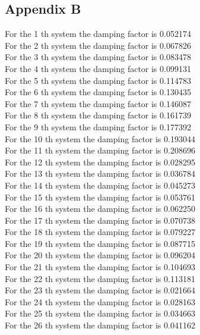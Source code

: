 \documentclass[11pt]{article}
\begin{document}
\subsection{Appendix B}
\label{sec:org2a10006}
For the 1 th system the damping factor is 0.052174 \\
For the 2 th system the damping factor is 0.067826 \\
For the 3 th system the damping factor is 0.083478 \\
For the 4 th system the damping factor is 0.099131 \\
For the 5 th system the damping factor is 0.114783 \\
For the 6 th system the damping factor is 0.130435 \\
For the 7 th system the damping factor is 0.146087 \\
For the 8 th system the damping factor is 0.161739 \\
For the 9 th system the damping factor is 0.177392 \\
For the 10 th system the damping factor is 0.193044 \\
For the 11 th system the damping factor is 0.208696 \\
For the 12 th system the damping factor is 0.028295 \\
For the 13 th system the damping factor is 0.036784 \\
For the 14 th system the damping factor is 0.045273 \\
For the 15 th system the damping factor is 0.053761 \\
For the 16 th system the damping factor is 0.062250 \\
For the 17 th system the damping factor is 0.070738 \\
For the 18 th system the damping factor is 0.079227 \\
For the 19 th system the damping factor is 0.087715 \\
For the 20 th system the damping factor is 0.096204 \\
For the 21 th system the damping factor is 0.104693 \\
For the 22 th system the damping factor is 0.113181 \\
For the 23 th system the damping factor is 0.021664 \\
For the 24 th system the damping factor is 0.028163 \\
For the 25 th system the damping factor is 0.034663 \\
For the 26 th system the damping factor is 0.041162 \\
\end{document}
